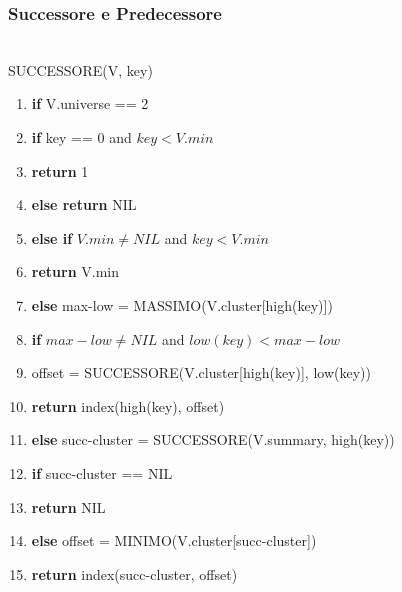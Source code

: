 \documentclass{article}
\begin{document}
\subsubsection{Successore e Predecessore}
            ~\\SUCCESSORE(V, key)
            \begin{enumerate}
                \item \textbf{if} V.universe == 2
                \item \hspace{10pt} \textbf{if} key == 0 and $key < V.min$
                \item \hspace{30pt} \textbf{return} 1
                \item \hspace{10pt} \textbf{else return} NIL
                \item \textbf{else if} $V.min \neq NIL$ and $ key < V.min$ 
                \item \hspace{10pt} \textbf{return} V.min
                \item \textbf{else} max-low = MASSIMO(V.cluster[high(key)])
                \item \hspace{10pt} \textbf{if} $max-low \neq NIL$ and $low(key) < max-low$
                \item \hspace{30pt} offset = SUCCESSORE(V.cluster[high(key)], low(key))
                \item \hspace{30pt} \textbf{return} index(high(key), offset)
                \item \hspace{10pt} \textbf{else} succ-cluster = SUCCESSORE(V.summary, high(key))
                \item \hspace{30pt} \textbf{if} succ-cluster == NIL
                \item \hspace{50pt} \textbf{return} NIL
                \item \hspace{30pt} \textbf{else} offset = MINIMO(V.cluster[succ-cluster])
                \item \hspace{50pt} \textbf{return} index(succ-cluster, offset)
            \end{enumerate}
            
\end{document}
